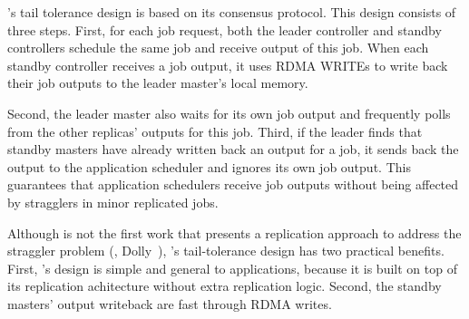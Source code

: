 \xxx's tail tolerance design is based on its \paxos consensus protocol. This 
design consists of three steps. First, for each job request, both the leader 
controller and standby controllers schedule the same job and receive output of 
this job. When each standby controller receives a job output, it 
uses RDMA WRITEs to write back their job outputs to the leader master's local 
memory.

Second, the leader master also waits for its own job output and frequently 
polls from the other replicas' outputs for this job. Third, if the leader finds 
that standby masters have already written back an output for a job, it sends 
back the output to the application scheduler and ignores its own job output. 
This guarantees that application schedulers receive job outputs without being 
affected by stragglers in minor replicated jobs.

Although \xxx is not the first work that presents a replication approach to 
address the straggler problem (\eg, Dolly~\cite{dolly:nsdi13}), \xxx's 
tail-tolerance design has two practical benefits. First, \xxx's design is 
simple and general to applications, because it is built on top of its \paxos 
replication achitecture without extra replication logic. Second, the standby 
masters' output writeback are fast through RDMA writes. 
